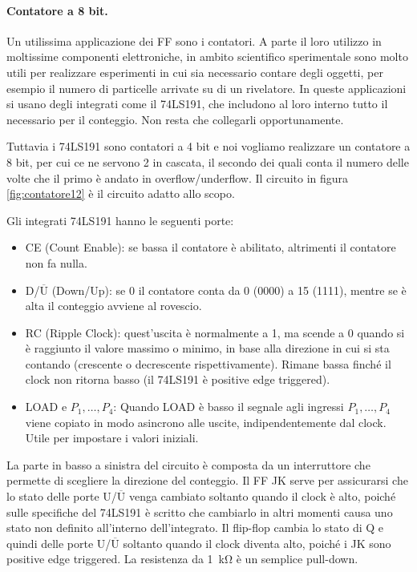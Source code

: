 \paragraph{Contatore a 8 bit.}

Un utilissima applicazione dei FF sono i contatori. A parte il loro utilizzo in moltissime componenti
elettroniche, in ambito scientifico sperimentale sono molto utili per realizzare esperimenti
in cui sia necessario contare degli oggetti, per esempio il numero di particelle arrivate su di un rivelatore.
In queste applicazioni si usano degli integrati come il 74LS191, che includono al loro interno tutto il necessario
per il conteggio. Non resta che collegarli opportunamente.

Tuttavia i 74LS191 sono contatori a 4 bit e noi vogliamo realizzare un contatore a 8 bit, per
cui ce ne servono 2 in cascata, il secondo dei quali conta il numero delle volte che il primo
è andato in overflow/underflow. Il circuito in figura \ref{fig:contatore12} è il circuito adatto allo scopo.

Gli integrati 74LS191 hanno le seguenti porte:

\begin{itemize}
    \item{CE (Count Enable): se bassa il contatore è abilitato, altrimenti il contatore non fa nulla.}
    \item{D/$\overline{\text{U}}$ (Down/Up): se 0 il contatore conta da 0 (0000) a 15 (1111), mentre se
        è alta il conteggio avviene al rovescio.}
    \item{RC (Ripple Clock): quest'uscita è normalmente a 1, ma scende a 0 quando si è raggiunto il valore massimo
        o minimo, in base alla direzione in cui si sta contando (crescente o decrescente rispettivamente).
        Rimane bassa finché il clock non ritorna basso (il 74LS191 è positive edge triggered).}
    \item{LOAD e $P_1,\dots,P_4$: Quando LOAD è basso il segnale agli ingressi $P_1,\dots,P_4$ viene copiato
        in modo asincrono alle uscite, indipendentemente dal clock. Utile per impostare i valori iniziali.}
\end{itemize}

La parte in basso a sinistra del circuito è composta da un interruttore che permette di scegliere la direzione
del conteggio. Il FF JK serve per assicurarsi che lo stato delle porte U/$\overline{\text{U}}$ venga cambiato
soltanto quando il clock è alto, poiché sulle specifiche del 74LS191 è scritto che cambiarlo in altri momenti
causa uno stato non definito all'interno dell'integrato. Il flip-flop cambia lo stato di Q e quindi delle porte
U/$\overline{\text{U}}$ soltanto quando il clock diventa alto, poiché i JK sono positive edge triggered.
La resistenza da \SI{1}{\kilo\ohm} è un semplice pull-down.


